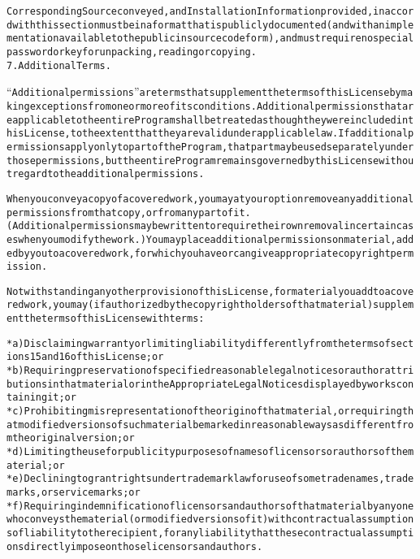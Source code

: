 \begin{alltt}
Corresponding Source conveyed, and Installation Information provided, in accord with this section must be in a format that is publicly documented (and with an implementation available to the public in source code form), and must require no special password or key for unpacking, reading or copying.
7. Additional Terms.

“Additional permissions” are terms that supplement the terms of this License by making exceptions from one or more of its conditions. Additional permissions that are applicable to the entire Program shall be treated as though they were included in this License, to the extent that they are valid under applicable law. If additional permissions apply only to part of the Program, that part may be used separately under those permissions, but the entire Program remains governed by this License without regard to the additional permissions.

When you convey a copy of a covered work, you may at your option remove any additional permissions from that copy, or from any part of it. (Additional permissions may be written to require their own removal in certain cases when you modify the work.) You may place additional permissions on material, added by you to a covered work, for which you have or can give appropriate copyright permission.

Notwithstanding any other provision of this License, for material you add to a covered work, you may (if authorized by the copyright holders of that material) supplement the terms of this License with terms:

    * a) Disclaiming warranty or limiting liability differently from the terms of sections 15 and 16 of this License; or
    * b) Requiring preservation of specified reasonable legal notices or author attributions in that material or in the Appropriate Legal Notices displayed by works containing it; or
    * c) Prohibiting misrepresentation of the origin of that material, or requiring that modified versions of such material be marked in reasonable ways as different from the original version; or
    * d) Limiting the use for publicity purposes of names of licensors or authors of the material; or
    * e) Declining to grant rights under trademark law for use of some trade names, trademarks, or service marks; or
    * f) Requiring indemnification of licensors and authors of that material by anyone who conveys the material (or modified versions of it) with contractual assumptions of liability to the recipient, for any liability that these contractual assumptions directly impose on those licensors and authors.


\end{alltt}
